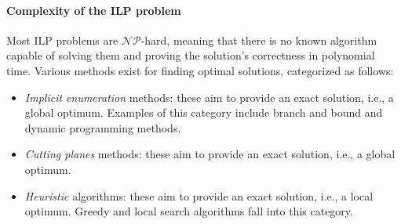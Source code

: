 \paragraph{Complexity of the ILP problem}
Most ILP problems are $\mathcal{NP}$-hard, meaning that there is no known algorithm capable of solving them and proving the solution's correctness in polynomial time. 
Various methods exist for finding optimal solutions, categorized as follows:
\begin{itemize}
    \item \textit{Implicit enumeration} methods: these aim to provide an exact solution, i.e., a global optimum. 
        Examples of this category include branch and bound and dynamic programming methods.
    \item \textit{Cutting planes} methods: these aim to provide an exact solution, i.e., a global optimum. 
    \item \textit{Heuristic} algorithms: these aim to provide an exact solution, i.e., a local optimum. 
        Greedy and local search algorithms fall into this category. 
\end{itemize}